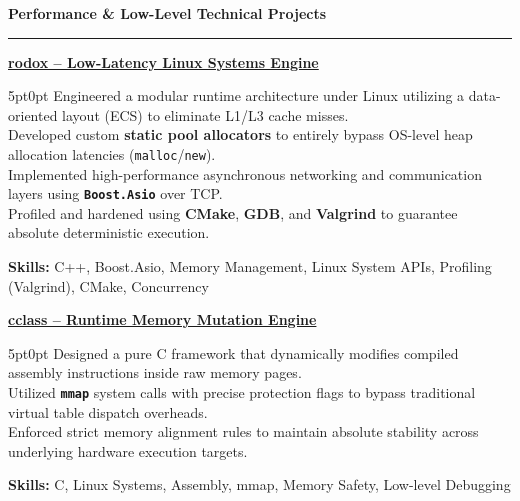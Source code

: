 \documentclass[9pt]{extarticle}
\begin{document}
\par\vspace{5pt}

{\large\bfseries Performance \& Low-Level Technical Projects}
\par\vspace{-8pt}
\rule{\linewidth}{0.4pt}
\par\vspace{5pt}

\underline{\bfseries rodox -- Low-Latency Linux Systems Engine}
\par
\begin{adjustwidth}{5pt}{0pt}
    Engineered a modular runtime architecture under Linux utilizing a data-oriented layout (ECS) to eliminate L1/L3 cache misses. \\
    Developed custom {\bfseries static pool allocators} to entirely bypass OS-level heap allocation latencies (\texttt{malloc}/\texttt{new}). \\
    Implemented high-performance asynchronous networking and communication layers using {\bfseries \texttt{Boost.Asio}} over TCP. \\
    Profiled and hardened using {\bfseries CMake}, {\bfseries GDB}, and {\bfseries Valgrind} to guarantee absolute deterministic execution.
\end{adjustwidth}
\par
{\bfseries Skills:} C++, Boost.Asio, Memory Management, Linux System APIs, Profiling (Valgrind), CMake, Concurrency

\par\vspace{8pt}

\underline{\bfseries cclass -- Runtime Memory Mutation Engine}
\par
\begin{adjustwidth}{5pt}{0pt}
    Designed a pure C framework that dynamically modifies compiled assembly instructions inside raw memory pages. \\
    Utilized {\bfseries \texttt{mmap}} system calls with precise protection flags to bypass traditional virtual table dispatch overheads. \\
    Enforced strict memory alignment rules to maintain absolute stability across underlying hardware execution targets.
\end{adjustwidth}
\par
{\bfseries Skills:} C, Linux Systems, Assembly, mmap, Memory Safety, Low-level Debugging

\par\vspace{8pt}
\end{document}
